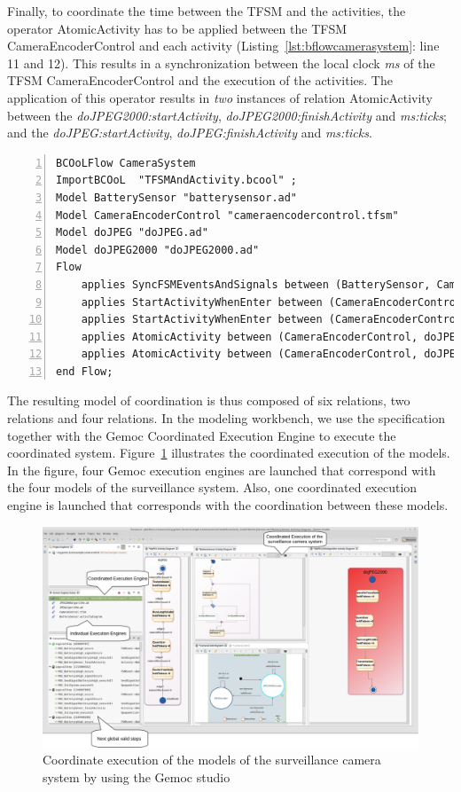 Finally, to coordinate the time between the TFSM and the activities, the operator AtomicActivity has to be applied between the TFSM CameraEncoderControl and each activity (Listing~\ref{lst:bflowcamerasystem}: line 11 and 12). This results in a synchronization between the local clock \emph{ms} of the TFSM CameraEncoderControl and the execution of the activities. The application of this operator results in \emph{two} instances of \moccml relation AtomicActivity between the \mse \emph{doJPEG2000:startActivity}, \emph{doJPEG2000:finishActivity} and \emph{ms:ticks}; and the \mse \emph{doJPEG:startActivity}, \emph{doJPEG:finishActivity} and \emph{ms:ticks}.


\begin{lstlisting}[language=bflow,
caption={\bflow specification for the Surveillance Camera System},
label={lst:bflowcamerasystem}, 
basicstyle=\scriptsize\ttfamily, backgroundcolor=\color{LGrey}, numbers=left, xleftmargin=2pt]
BCOoLFlow CameraSystem
ImportBCOoL  "TFSMAndActivity.bcool" ;
Model BatterySensor "batterysensor.ad"
Model CameraEncoderControl "cameraencodercontrol.tfsm"
Model doJPEG "doJPEG.ad"
Model doJPEG2000 "doJPEG2000.ad"
Flow 
	applies SyncFSMEventsAndSignals between (BatterySensor, CameraEncoderControl);
	applies StartActivityWhenEnter between (CameraEncoderControl, doJPEG);
	applies StartActivityWhenEnter between (CameraEncoderControl, doJPEG2000);
	applies AtomicActivity between (CameraEncoderControl, doJPEG);		
	applies AtomicActivity between (CameraEncoderControl, doJPEG2000);		
end Flow;
\end{lstlisting}

The resulting model of coordination is thus composed of six relations, \ie two \ccsl relations and four \moccml relations. In the modeling workbench, we use the \bflow specification together with the Gemoc Coordinated Execution Engine to execute the coordinated system. Figure~\ref{fig:studiocamera} illustrates the coordinated execution of the models. In the figure, four Gemoc execution engines are launched that correspond with the four models of the surveillance system. Also, one coordinated execution engine is launched that corresponds with the coordination between these models. 

		\begin{figure}[h]
			\center
			\includegraphics[width=.9\columnwidth]{examples/figs/screenshot}
			\caption{Coordinate execution of the models of the surveillance camera system by using the Gemoc studio}
			\label{fig:studiocamera}
		\end{figure}


